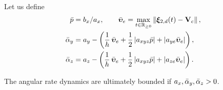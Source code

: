 \begin{lemma}
    \label{lemma:handpos_def_ultimate_boundedness}
    Let us define
    \begin{subequations}
        \begin{align}
            \Bar{p} &= b_x / a_x, \qquad
            \Bar{\bm{\upsilon}}_e = \max_{t \in \mathbb{R}_{\geq 0}}\left\|\bm{\xi}_{2, d}(t) - \mathbf{V}_c\right\|, \\
            \Bar{\alpha}_y &= a_y - \left(\frac{1}{h}\,\Bar{\bm{\upsilon}}_e + \frac{1}{2}\left|a_{xyz}\Bar{p}\right| + \left|a_{ye}\Bar{\bm{\upsilon}}_e\right|\right), \label{eq:handpos_def_a_y_bounds} \\
            \Bar{\alpha}_z &= a_z - \left(\frac{1}{h}\,\Bar{\bm{\upsilon}}_e + \frac{1}{2}\left|a_{xyz}\Bar{p}\right| + \left|a_{ze}\Bar{\bm{\upsilon}}_e\right|\right). \label{eq:handpos_def_a_z_bounds}
        \end{align} \label{eq:handpos_def_a_bounds}
    \end{subequations}

    \noindent The angular rate dynamics are ultimately bounded if $a_x, \Bar{\alpha}_y, \Bar{\alpha}_z > 0$.
\end{lemma}
